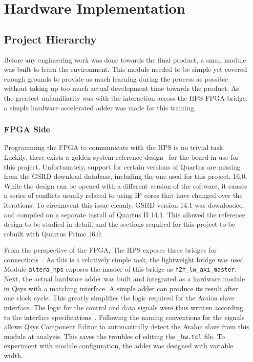\section{Hardware Implementation}

\subsection{Project Hierarchy}
Before any engineering work was done towards the final product, a small module was built to learn the environment.
This module needed to be simple yet covered enough grounds to provide as much learning during the process as possible without taking up too much actual development time towards the product.
As the greatest unfamiliarity was with the interaction across the HPS-FPGA bridge, a simple hardware accelerated adder was made for this training.

\subsubsection{FPGA Side}
Programming the FPGA to communicate with the HPS is no trivial task.
Luckily, there exists a golden system reference design~\cite{Rocket1} for the board in use for this project.
Unfortunately, support for certain versions of Quartus are missing from the GSRD download database, including the one used for this project, 16.0.
While the design can be opened with a different version of the software, it causes a series of conflicts usually related to using IP cores that have changed over the iterations.
To circumvent this issue cleanly, GSRD version 14.1 was downloaded and compiled on a separate install of Quartus II 14.1.
This allowed the reference design to be studied in detail, and the sections required for this project to be rebuilt with Quartus Prime 16.0.

From the perspective of the FPGA, The HPS exposes three bridges for connections~\cite{Altera6}.
As this is a relatively simple task, the lightweight bridge was used.
Module \texttt{altera\_hps} exposes the master of this bridge as
\texttt{h2f\_lw\_axi\_master}.
Next, the actual hardware adder was built and integrated as a hardware module in Qsys with a matching interface.
A simple adder can produce its result after one clock cycle.
This greatly simplifies the logic required for the Avalon slave interface.
The logic for the control and data signals were thus written according to the interface specifications~\cite{Intel3}.
Following the naming conventions for the signals allows Qsys Component Editor to automatically detect the Avalon slave from this module at analysis.
This saves the troubles of editing the \texttt{\_hw.tcl} file.
To experiment with module configuration, the adder was designed with variable width.

